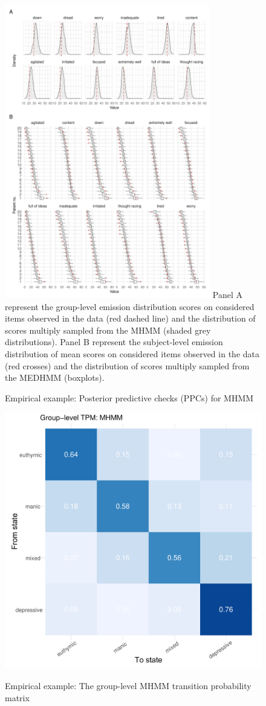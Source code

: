 \begin{figure}[h]
\centering
\caption{Empirical example: Posterior predictive checks (PPCs) for MHMM}
\includegraphics[width=0.8\textwidth]{graphics/ppc_mean_hmm.pdf}
\flushleft
\footnotesize
\justifying
 Panel A represent the group-level emission distribution scores on considered items observed in the data (red dashed line) and the distribution of scores multiply sampled from the MHMM (shaded grey distributions). Panel B represent the subject-level emission distribution of mean scores on considered items observed in the data (red crosses) and the distribution of scores multiply sampled from the MEDHMM (boxplots). 
 \label{ppc_out_mean_mhmm}
\end{figure}


\begin{figure}[h]
\caption{Empirical example: The group-level MHMM transition probability matrix}
    \centering
    \includegraphics[width=0.65\linewidth]{graphics/group_trandition_matricesvv2.pdf}
    \label{emp_group_trans}
\end{figure}